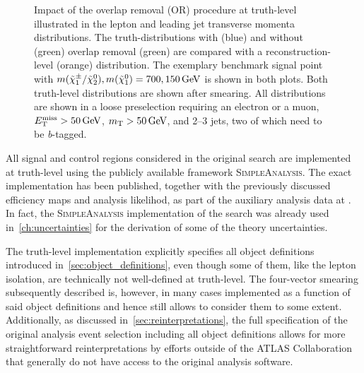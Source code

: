 \begin{figure}
	\caption{Impact of the overlap removal (OR) procedure at truth-level illustrated in the lepton and leading jet transverse momenta distributions. The truth-distributions with (blue) and without (green) overlap removal (green) are compared with a reconstruction-level (orange) distribution. The exemplary benchmark signal point with $m(\charg/\neutr), m(\lsp) = 700, \SI{150}{\GeV}$ is shown in both plots. Both truth-level distributions are shown after smearing. All distributions are shown in a loose preselection requiring an electron or a muon, $\met>\SI{50}{\GeV}$, $\mt > \SI{50}{\GeV}$, and 2--3 jets, two of which need to be \textit{b}-tagged.}
	\label{fig:overlap_removal_truth}
\end{figure}

All signal and control regions considered in the original \onelepton search are implemented at truth-level using the publicly available framework \textsc{SimpleAnalysis}.
The exact implementation has been published, together with the previously discussed efficiency maps and analysis likelihod, as part of the auxiliary analysis data at \cite{HEPdata_1Lbb}.
In fact, the \textsc{SimpleAnalysis} implementation of the search was already used in~\cref{ch:uncertainties} for the derivation of some of the theory uncertainties.

The truth-level implementation explicitly specifies all object definitions introduced in~\cref{sec:object_definitions}, even though some of them, like the lepton isolation, are technically not well-defined at truth-level.
The four-vector smearing subsequently described is, however, in many cases implemented as a function of said object definitions and hence still allows to consider them to some extent.
Additionally, as discussed in~\cref{sec:reinterpretations}, the full specification of the original analysis event selection including all object definitions allows for more straightforward reinterpretations by efforts outside of the ATLAS Collaboration that generally do not have access to the original analysis software.

